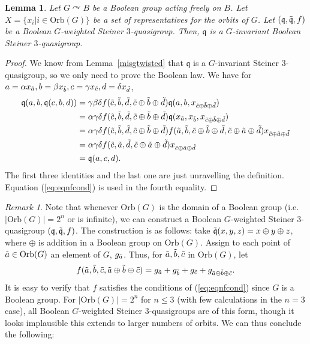 \documentclass{article}
\newtheorem{lemma}[theorem]{Lemma}
\theoremstyle{remark}
\newtheorem{remark}[theorem]{Remark}
\theoremstyle{definition}
\def\acts{\curvearrowright}
\begin{document}
\begin{lemma} Let $G\acts B$ be a Boolean group acting freely on $B$. Let $X=\{ x_i \vert i\in \mathrm{Orb}(G)\}$ be a set of representatives for the orbits of $G$. Let $(\mathfrak{q}, \Tilde{\mathfrak{q}}, f)$ be a  Boolean $G$-weighted Steiner $3$-quasigroup. Then, $\mathfrak{q}$ is a $G$-invariant Boolean Steiner $3$-quasigroup.
\end{lemma}
\begin{proof}
We know from Lemma~\ref{misgtwisted} that $\mathfrak{q}$ is a $G$-invariant Steiner $3$-quasigroup, so we only need to prove the Boolean law. We have for $a=\alpha x_{\Tilde{a}}, b=\beta x_{\Tilde{b}}, c=\gamma x_{\Tilde{c}}, d=\delta  x_{\Tilde{d}}$,
\begin{align*}
\mathfrak{q}(a, b, \mathfrak{q}(c, b, d)) &=\gamma\beta\delta f(\Tilde{c}, \Tilde{b}, \Tilde{d}, \Tilde{c}\oplus \Tilde{b} \oplus \Tilde{d})\mathfrak{q}(a, b, x_{\Tilde{c}\oplus \Tilde{b} \oplus \Tilde{d}})\\
&=\alpha\gamma\delta f(\Tilde{c}, \Tilde{b}, \Tilde{d}, \Tilde{c}\oplus \Tilde{b} \oplus \Tilde{d})\mathfrak{q}(x_{\Tilde{a}}, x_{\Tilde{b}}, x_{\Tilde{c}\oplus \Tilde{b} \oplus \Tilde{d}})\\
    &=\alpha\gamma\delta f(\Tilde{c}, \Tilde{b}, \Tilde{d}, \Tilde{c}\oplus \Tilde{b} \oplus \Tilde{d}) f(\Tilde{a}, \Tilde{b}, \Tilde{c}\oplus \Tilde{b} \oplus \Tilde{d}, \Tilde{c}\oplus \Tilde{a} \oplus \Tilde{d})  x_{\Tilde{c}\oplus \Tilde{a} \oplus \Tilde{d}}\\
    &=\alpha\gamma\delta f(\Tilde{c}, \Tilde{a}, \Tilde{d}, \Tilde{c}\oplus \Tilde{a} \oplus \Tilde{d}) x_{\Tilde{c}\oplus \Tilde{a} \oplus \Tilde{d}}\\
    &=\mathfrak{q}(a,c, d).
\end{align*}
The first three identities and the last one are just unravelling the definition. Equation (\ref{eq:eqnfcond}) is used in the fourth equality.  
\end{proof}

\begin{remark}\label{rem:existenceBool} Note that whenever $\mathrm{Orb}(G)$ is the domain of a Boolean group (i.e. $|\mathrm{Orb}(G)|=2^n$ or is infinite), we can construct a Boolean $G$-weighted Steiner $3$-quasigroup $(\mathfrak{q}, \Tilde{\mathfrak{q}}, f)$. The construction is as follows: take $\Tilde{\mathfrak{q}}(x,y,z)=x\oplus y\oplus z$, where $\oplus$ is addition in a Boolean group on $\mathrm{Orb}(G)$. Assign to each point of $\Tilde{a}\in \mathrm{Orb}(G)$ an element of $G$, $g_{\Tilde{a}}$. Thus, for $\Tilde{a}, \Tilde{b}, \Tilde{c}$ in $\mathrm{Orb}(G)$, let
\[f(\Tilde{a}, \Tilde{b}, \Tilde{c}, \Tilde{a}\oplus\Tilde{b}\oplus\Tilde{c})=g_{\Tilde{a}}+g_{\Tilde{b}}+g_{\Tilde{c}}+g_{\Tilde{a}\oplus\Tilde{b}\oplus\Tilde{c}}.\]
It is easy to verify that $f$ satisfies the conditions of (\ref{eq:eqnfcond}) since $G$ is a Boolean group. For $|\mathrm{Orb}(G)|=2^n$ for $n\leq 3$ (with few calculations in the $n=3$ case), all Boolean $G$-weighted Steiner $3$-quasigroups are of this form, though it looks implausible this extends to larger numbers of orbits. We can thus conclude the following:
\end{remark}
\end{document}
